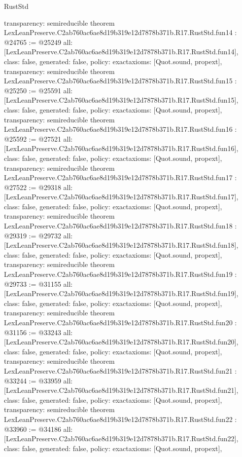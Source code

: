 \begin{lexlean}{RustStd}
\begin{coremodule}
{  transparency: semireducible
}
theorem LexLeanPreserve.C2ab760ac6ae8d19b319e12d7878b371b.R17.RustStd.fun14 : @24765 := @25249 {
  all: [LexLeanPreserve.C2ab760ac6ae8d19b319e12d7878b371b.R17.RustStd.fun14],
  class: false,
  generated: false,
  policy: exact{axioms: [Quot.sound, propext]},
  transparency: semireducible
}
theorem LexLeanPreserve.C2ab760ac6ae8d19b319e12d7878b371b.R17.RustStd.fun15 : @25250 := @25591 {
  all: [LexLeanPreserve.C2ab760ac6ae8d19b319e12d7878b371b.R17.RustStd.fun15],
  class: false,
  generated: false,
  policy: exact{axioms: [Quot.sound, propext]},
  transparency: semireducible
}
theorem LexLeanPreserve.C2ab760ac6ae8d19b319e12d7878b371b.R17.RustStd.fun16 : @25592 := @27521 {
  all: [LexLeanPreserve.C2ab760ac6ae8d19b319e12d7878b371b.R17.RustStd.fun16],
  class: false,
  generated: false,
  policy: exact{axioms: [Quot.sound, propext]},
  transparency: semireducible
}
theorem LexLeanPreserve.C2ab760ac6ae8d19b319e12d7878b371b.R17.RustStd.fun17 : @27522 := @29318 {
  all: [LexLeanPreserve.C2ab760ac6ae8d19b319e12d7878b371b.R17.RustStd.fun17],
  class: false,
  generated: false,
  policy: exact{axioms: [Quot.sound, propext]},
  transparency: semireducible
}
theorem LexLeanPreserve.C2ab760ac6ae8d19b319e12d7878b371b.R17.RustStd.fun18 : @29319 := @29732 {
  all: [LexLeanPreserve.C2ab760ac6ae8d19b319e12d7878b371b.R17.RustStd.fun18],
  class: false,
  generated: false,
  policy: exact{axioms: [Quot.sound, propext]},
  transparency: semireducible
}
theorem LexLeanPreserve.C2ab760ac6ae8d19b319e12d7878b371b.R17.RustStd.fun19 : @29733 := @31155 {
  all: [LexLeanPreserve.C2ab760ac6ae8d19b319e12d7878b371b.R17.RustStd.fun19],
  class: false,
  generated: false,
  policy: exact{axioms: [Quot.sound, propext]},
  transparency: semireducible
}
theorem LexLeanPreserve.C2ab760ac6ae8d19b319e12d7878b371b.R17.RustStd.fun20 : @31156 := @33243 {
  all: [LexLeanPreserve.C2ab760ac6ae8d19b319e12d7878b371b.R17.RustStd.fun20],
  class: false,
  generated: false,
  policy: exact{axioms: [Quot.sound, propext]},
  transparency: semireducible
}
theorem LexLeanPreserve.C2ab760ac6ae8d19b319e12d7878b371b.R17.RustStd.fun21 : @33244 := @33959 {
  all: [LexLeanPreserve.C2ab760ac6ae8d19b319e12d7878b371b.R17.RustStd.fun21],
  class: false,
  generated: false,
  policy: exact{axioms: [Quot.sound, propext]},
  transparency: semireducible
}
theorem LexLeanPreserve.C2ab760ac6ae8d19b319e12d7878b371b.R17.RustStd.fun22 : @33960 := @34186 {
  all: [LexLeanPreserve.C2ab760ac6ae8d19b319e12d7878b371b.R17.RustStd.fun22],
  class: false,
  generated: false,
  policy: exact{axioms: [Quot.sound, propext]},
}
\end{coremodule}
\end{lexlean}
